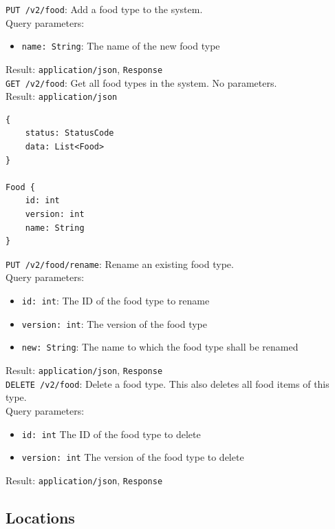 \documentclass[12pt]{report}
\begin{document}
\texttt{PUT /v2/food}: Add a food type to the system.\\
Query parameters:
\begin{itemize}
\item \texttt{name: String}: The name of the new food type
\end{itemize}
Result: \texttt{application/json}, \texttt{Response}\vspace{7mm}\\
\texttt{GET /v2/food}: Get all food types in the system.
No parameters.\\
Result: \texttt{application/json}
\begin{lstlisting}
{
    status: StatusCode
    data: List<Food>
}

Food {
    id: int
    version: int
    name: String
}
\end{lstlisting}\vspace{7mm}
\texttt{PUT /v2/food/rename}: Rename an existing food type.\\
Query parameters:
\begin{itemize}
\item \texttt{id: int}: The ID of the food type to rename
\item \texttt{version: int}: The version of the food type
\item \texttt{new: String}: The name to which the food type shall be renamed
\end{itemize}
Result: \texttt{application/json}, \texttt{Response}\vspace{7mm}\\
\texttt{DELETE /v2/food}: Delete a food type. This also deletes all food
items of this type.\\
Query parameters:
\begin{itemize}
\item \texttt{id: int} The ID of the food type to delete
\item \texttt{version: int} The version of the food type to delete
\end{itemize}
Result: \texttt{application/json}, \texttt{Response}

\subsection{Locations}
\end{document}
